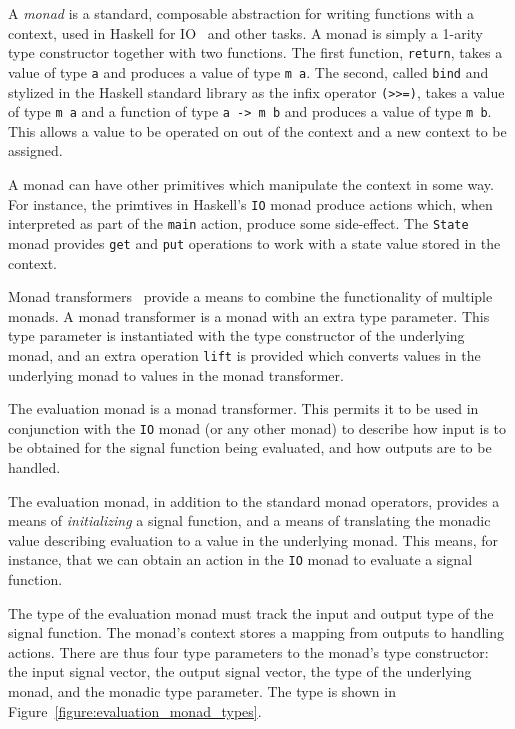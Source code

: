 \documentclass[draft]{llncs}
\begin{document}
A {\em monad} is a standard, composable abstraction for writing functions with
a context, used in Haskell for IO~\cite{PeytonJones1993,PeytonJones2001} and
other tasks. A monad is simply a 1-arity type constructor together with two
functions. The first function, {\tt return}, takes a value of type {\tt a} and
produces a value of type {\tt m a}. The second, called {\tt bind} and stylized
in the Haskell standard library as the infix operator {\tt (>>=)}, takes a value
of type {\tt m a} and a function of type {\tt a -> m b} and produces a value of
type {\tt m b}. This allows a value to be operated on out of the context and a
new context to be assigned.

A monad can have other primitives which manipulate the context in some way. For 
instance, the primtives in Haskell's {\tt IO} monad produce actions which, when
interpreted as part of the {\tt main} action, produce some side-effect. The
{\tt State} monad provides {\tt get} and {\tt put} operations to work with a 
state value stored in the context.

Monad transformers~\cite{Jones1995} provide a means to combine the functionality
of multiple monads. A monad transformer is a monad with an extra type parameter.
This type parameter is instantiated with the type constructor of the underlying
monad, and an extra operation {\tt lift} is provided which converts values in
the underlying monad to values in the monad transformer.

The evaluation monad is a monad transformer. This permits it to be used in
conjunction with the {\tt IO} monad (or any other monad) to describe how input
is to be obtained for the signal function being evaluated, and how outputs are
to be handled.

The evaluation monad, in addition to the standard monad operators, provides a
means of {\em initializing} a signal function, and a means of translating the
monadic value describing evaluation to a value in the underlying monad. This
means, for instance, that we can obtain an action in the {\tt IO} monad to
evaluate a signal function.

The type of the evaluation monad must track the input and output type of the
signal function. The monad's context stores a mapping from outputs to handling
actions. There are thus four type parameters to the monad's type
constructor: the input signal vector, the output signal vector, the type of the
underlying monad, and the monadic type parameter. The type is shown in
Figure~\ref{figure:evaluation_monad_types}.
\end{document}

